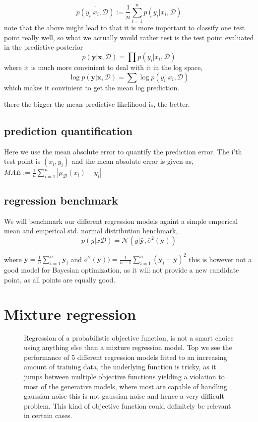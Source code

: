 $$\overline{p(y_i|x_i,\mathcal{D})} := \frac{1}{n}\sum_{i=1}^n p(y_i|x_i,\mathcal{D})$$
note that the above might lead to that it is more important to classify one test point
really well, so what we actually would rather test is the test point evaluated in the predictive
posterior $$p(\textbf{y}|\textbf{x}, \mathcal{D}) = \prod p(y_i|x_i, \mathcal{D})$$
where it is much more convinient to deal with it in the log space, 
 $$\log p(\textbf{y}|\textbf{x}, \mathcal{D}) = \sum \log p(y_i|x_i, \mathcal{D})$$
which makes it convinient to get the mean log prediction. 

there the bigger the mean predictive likelihood is, the better. 

\subsection{prediction quantification}
Here we use the mean absolute error to quantify the prediction error. The i'th test point is
$(x_i,y_i)$ and the mean absolute error is given as, 
$MAE :=\frac{1}{n}\sum_{i=1}^n |\mu_{\mathcal{D}}(x_i) - y_i| $

\subsection{regression benchmark}
We will benchmark our different regression models againt a simple emperical mean and
emperical std. normal distribution benchmark, 
$$p(y|x\mathcal{D}) = \mathcal{N}(y| \bar{\textbf{y}} , \bar{\sigma}^2 (\textbf{y}))$$

where $\bar{\textbf{y}} = \frac{1}{n}\sum_{i=1}^n \textbf{y}_i $ and 
$\bar{\sigma}^2 (\textbf{y})) = \frac{1}{n-1}\sum_{i=1}^n (\textbf{y}_i-\bar{\textbf{y}})^2 $
this is however not a good model for Bayesian optimization, as it will not provide a
new candidate point, as all points are equally good. 


\section{Mixture regression}

\begin{figure}
  \caption{Regression of a probabilistic objective function, is not a smart choice
  using anything else than a mixture regression model. Top we see the performance
  of 5 different regression models fitted to an increasing amount of training data, 
  the underlying function is tricky, as it jumps between multiple objective functions
  yielding a violation to most of the generative models, where most are capable of
  handling gaussian noise this is not gaussian noise and hence a very difficult problem. 
  This kind of objective function could definitely be relevant in certain cases.}
\end{figure}

